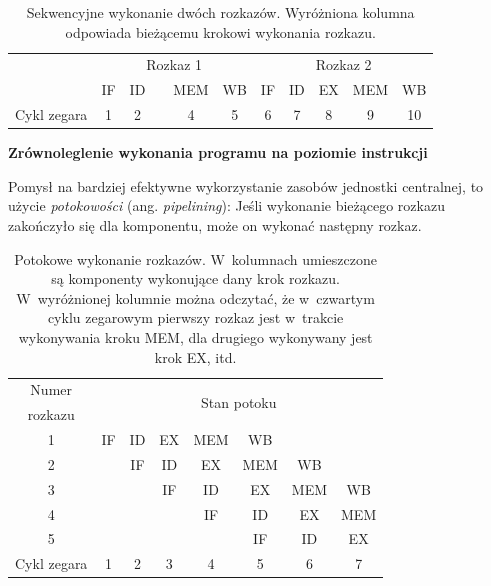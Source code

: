 \documentclass[11pt,makeidx]{mwart}
\begin{document}
	\begin{table}
	\centering
	\begin{tabular}{|c|c|c|c|c|c|c|c|c|c|c|} \hline
	& \multicolumn{5}{c|}{Rozkaz 1} & \multicolumn{5}{c|}{Rozkaz 2}  \\
	\hhline{|~|*{10}-}& IF & ID & {\cellcolor{yellow}{EX}} & MEM & WB & IF & ID & EX & MEM & WB\\ \hline \hline
	Cykl zegara & 1 & 2 & {\cellcolor{yellow}{3}} & 4 & 5 & 6 & 7 & 8 & 9 & 10 \\ \hline
	\end{tabular}\par
	\caption[Sekwencyjne wykonanie dwóch rozkazów]{Sekwencyjne wykonanie dwóch rozkazów. Wyróżniona kolumna odpowiada bieżącemu krokowi wykonania
	rozkazu.
	}
	\end{table}\par
\par
%
\indent
{\bf Zrównoleglenie wykonania programu na poziomie instrukcji}
\par
%
\indent 
	Pomysł na bardziej efektywne wykorzystanie zasobów jednostki centralnej, to użycie \emph{potokowości} (ang. \emph{pipelining}):
	Jeśli wykonanie bieżącego rozkazu zakończyło się dla komponentu, może on wykonać następny rozkaz.
	\begin{table}[h]
	\centering
	\begin{tabular}{|c|c|c|c|c|c|c|c|} \hline
	Numer 		 & \multicolumn{7}{c|}{\multirow{2}{*}{Stan potoku}} \\
	rozkazu & \multicolumn{7}{c|}{} \\ \hline
	1 & IF & ID & EX & \cellcolor{yellow} MEM & WB & & \\ \hline
	2 & & IF & ID & \cellcolor{yellow} EX & MEM & WB & \\ \hline
	3 & & & IF & \cellcolor{yellow} ID & EX & MEM & WB \\ \hline
	4 & & & & \cellcolor{yellow} IF & ID & EX & MEM \\ \hline
	5 & & & & \cellcolor{yellow} & IF & ID & EX \\ \hline \hline
	Cykl zegara & 1 & 2 & 3 & \cellcolor{yellow} 4 & 5 & 6 & 7 \\ \hline
	\end{tabular}
	\caption[Potokowe wykonanie rozkazów]{Potokowe wykonanie rozkazów. W~kolumnach umieszczone są komponenty wykonujące dany krok rozkazu.
	W~wyróżnionej kolumnie można odczytać, że w~czwartym cyklu zegarowym pierwszy rozkaz jest w~trakcie wykonywania kroku MEM, 
	dla drugiego wykonywany jest krok EX, itd.}
	\label{tab:pipeline}
	\end{table}
\end{document}
